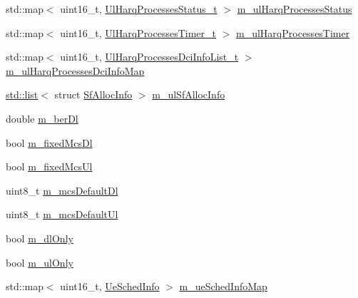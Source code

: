 \begin{DoxyCompactItemize}
\item 
std\+::map$<$ uint16\+\_\+t, \hyperlink{classns3_1_1MmWaveFlexTtiPfMacScheduler_aad5df5fc3e0a4493cfe1a7ee492bfa80}{Ul\+Harq\+Processes\+Status\+\_\+t} $>$ \hyperlink{classns3_1_1MmWaveFlexTtiPfMacScheduler_aee0051900f7d928d25d577ad83983bf4}{m\+\_\+ul\+Harq\+Processes\+Status}
\item 
std\+::map$<$ uint16\+\_\+t, \hyperlink{classns3_1_1MmWaveFlexTtiPfMacScheduler_af7160a47f476cca40ccd6a2e2d8bcbf9}{Ul\+Harq\+Processes\+Timer\+\_\+t} $>$ \hyperlink{classns3_1_1MmWaveFlexTtiPfMacScheduler_ac22941904760bb3380302039caad87e0}{m\+\_\+ul\+Harq\+Processes\+Timer}
\item 
std\+::map$<$ uint16\+\_\+t, \hyperlink{classns3_1_1MmWaveFlexTtiPfMacScheduler_af5f2702a7b78ccd42e58ba642340f888}{Ul\+Harq\+Processes\+Dci\+Info\+List\+\_\+t} $>$ \hyperlink{classns3_1_1MmWaveFlexTtiPfMacScheduler_a8b50ed4fc6df0561404f4aad5aa3d384}{m\+\_\+ul\+Harq\+Processes\+Dci\+Info\+Map}
\item 
\hyperlink{openflow-interface_8h_afd9bcfa176617760671b67580f536fa7}{std\+::list}$<$ struct \hyperlink{structns3_1_1SfAllocInfo}{Sf\+Alloc\+Info} $>$ \hyperlink{classns3_1_1MmWaveFlexTtiPfMacScheduler_a45bca3194b54db4f870cf13813521222}{m\+\_\+ul\+Sf\+Alloc\+Info}
\item 
double \hyperlink{classns3_1_1MmWaveFlexTtiPfMacScheduler_a92e6959d8831c2958167a075f0b38af8}{m\+\_\+ber\+Dl}
\item 
bool \hyperlink{classns3_1_1MmWaveFlexTtiPfMacScheduler_a6db2b298ff4e4dd82c45b543e9110aa4}{m\+\_\+fixed\+Mcs\+Dl}
\item 
bool \hyperlink{classns3_1_1MmWaveFlexTtiPfMacScheduler_a44841cc06dfeca9a33cd8e2ad831c3a0}{m\+\_\+fixed\+Mcs\+Ul}
\item 
uint8\+\_\+t \hyperlink{classns3_1_1MmWaveFlexTtiPfMacScheduler_aea4907ad0e1c718ba3255d0e1aee369c}{m\+\_\+mcs\+Default\+Dl}
\item 
uint8\+\_\+t \hyperlink{classns3_1_1MmWaveFlexTtiPfMacScheduler_a6ddeee7628a4f68bbe0ab7b5d5bc72b8}{m\+\_\+mcs\+Default\+Ul}
\item 
bool \hyperlink{classns3_1_1MmWaveFlexTtiPfMacScheduler_ab0f6fd985da313250889b03804ba3752}{m\+\_\+dl\+Only}
\item 
bool \hyperlink{classns3_1_1MmWaveFlexTtiPfMacScheduler_ae45916409f6aa294dc424f2fc3879a5d}{m\+\_\+ul\+Only}
\item 
std\+::map$<$ uint16\+\_\+t, \hyperlink{structns3_1_1MmWaveFlexTtiPfMacScheduler_1_1UeSchedInfo}{Ue\+Sched\+Info} $>$ \hyperlink{classns3_1_1MmWaveFlexTtiPfMacScheduler_a3b6dd19d8156d24c8d30cc562843b740}{m\+\_\+ue\+Sched\+Info\+Map}

\end{DoxyCompactItemize}
